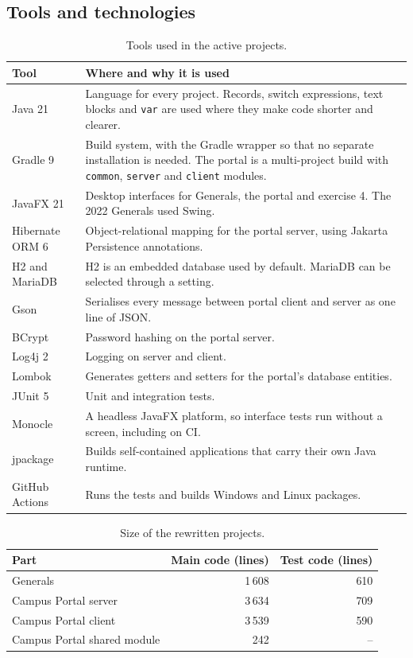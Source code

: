 \documentclass[11pt,a4paper]{article}
\begin{document}
\subsection{Tools and technologies}

\begin{table}[h]
\centering
\small
\begin{tabularx}{\textwidth}{@{}l X@{}}
\toprule
\textbf{Tool} & \textbf{Where and why it is used} \\
\midrule
Java 21 & Language for every project. Records, switch expressions, text blocks and \texttt{var} are used where they make code shorter and clearer. \\
Gradle 9 & Build system, with the Gradle wrapper so that no separate installation is needed. The portal is a multi-project build with \texttt{common}, \texttt{server} and \texttt{client} modules. \\
JavaFX 21 & Desktop interfaces for Generals, the portal and exercise 4. The 2022 Generals used Swing. \\
Hibernate ORM 6 & Object-relational mapping for the portal server, using Jakarta Persistence annotations. \\
H2 and MariaDB & H2 is an embedded database used by default. MariaDB can be selected through a setting. \\
Gson & Serialises every message between portal client and server as one line of JSON. \\
BCrypt & Password hashing on the portal server. \\
Log4j 2 & Logging on server and client. \\
Lombok & Generates getters and setters for the portal's database entities. \\
JUnit 5 & Unit and integration tests. \\
Monocle & A headless JavaFX platform, so interface tests run without a screen, including on CI. \\
jpackage & Builds self-contained applications that carry their own Java runtime. \\
GitHub Actions & Runs the tests and builds Windows and Linux packages. \\
\bottomrule
\end{tabularx}
\caption{Tools used in the active projects.}
\end{table}

\begin{table}[h]
\centering
\small
\begin{tabular}{@{}lrr@{}}
\toprule
\textbf{Part} & \textbf{Main code (lines)} & \textbf{Test code (lines)} \\
\midrule
Generals & 1\,608 & 610 \\
Campus Portal server & 3\,634 & 709 \\
Campus Portal client & 3\,539 & 590 \\
Campus Portal shared module & 242 & -- \\
\bottomrule
\end{tabular}
\caption{Size of the rewritten projects.}
\end{table}
\end{document}
